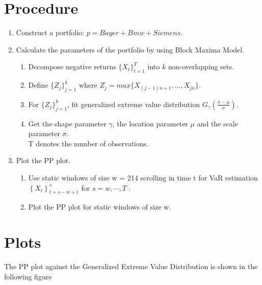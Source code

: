 \documentclass[a4paper,11pt]{article}
\begin{document}
\begin{flushleft}
\begin{enumerate}
\end{enumerate}


\section{Procedure}
\begin{enumerate}
\item Construct a portfolio: $p=Bayer+Bmw+Siemens$.\\

\item Calculate the parameters of the portfolio by using Block Maxima Model.\\
 \begin{enumerate}
	
  \item Decompose negative returns $\{X_t\}_{t=1}^T$ into $k$ non-overlapping sets.\\

  \item Define $\{Z_j\}_{j=1}^k$ where $Z_j=max\{X_{(j-1)n+1},...,X_{jn}\}$.\\

 \item For $\{Z_j\}_{j=1}^k$, fit generalized extreme value distribution $G_{\gamma}(\frac{x-\mu}{\sigma})$.\\

 \item Get the shape parameter $\gamma$, the location parameter $\mu$ and the scale parameter $\sigma$.\\
  T denotes the number of observations.\\
 \end{enumerate}
 
\item Plot the PP plot.\\
\begin{enumerate}
\item Use static windows of size w = 214 scrolling in time t for VaR estimation $\left \{ X_t \right \}_{t=s-w+1}^{s}$ for $s = w,\cdots ,T$ .\\

\item Plot the PP plot for static windows of size w.\\
\end{enumerate}

\end{enumerate}
\section{Plots}
The PP plot against the Generalized Extreme Value Distribution is shown in the following figure\\


\end{flushleft}
\end{document}
